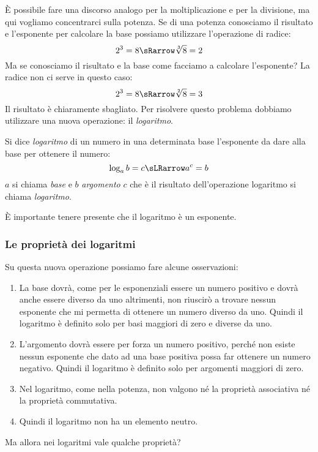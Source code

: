 È possibile fare una discorso analogo per la moltiplicazione e per la 
divisione, ma qui vogliamo concentrarci sulla potenza. Se di una potenza 
conosciamo il risultato e l'esponente per calcolare la base possiamo utilizzare 
l'operazione di radice:
\[2^3 = 8 \sRarrow \sqrt[3]{8} = 2 \]
Ma se conosciamo il risultato e la base come facciamo a calcolare l'esponente?
La radice non ci serve in questo caso:
\[2^3 = 8 \sRarrow \sqrt[2]{8} = 3 \]
Il risultato è chiaramente sbagliato. Per risolvere questo problema dobbiamo 
utilizzare una nuova operazione: il \emph{logaritmo}.

\begin{definizione}[Logaritmo]
 Si dice \emph{logaritmo} di un numero in una determinata base l'esponente da 
dare alla base per ottenere il numero:
\[\log_a {b} = c \sLRarrow a^c = b\]
\(a\) si chiama \emph{base} e \(b\) \emph{argomento} \(c\) che è il risultato 
dell'operazione logaritmo si chiama \emph{logaritmo}.
\end{definizione}

È importante tenere presente che il logaritmo è un esponente. 

\subsubsection{Le proprietà dei logaritmi}
\label{subsubsec:esplog_proprieta_logaritmi}

Su questa nuova operazione possiamo fare alcune osservazioni:

\begin{enumerate}
 \item La base dovrà, come per le esponenziali essere un numero positivo e 
dovrà anche essere diverso da uno altrimenti, non riuscirò a trovare nessun 
esponente che mi permetta di ottenere un numero diverso da uno. Quindi il 
logaritmo è definito solo per basi maggiori di zero e diverse da uno.
 \item L'argomento dovrà essere per forza un numero positivo, perché non esiste 
nessun esponente che dato ad una base positiva possa far ottenere un numero 
negativo. Quindi il logaritmo è definito solo per argomenti maggiori di zero.
 \item Nel logaritmo, come nella potenza, non valgono né la proprietà 
associativa né la proprietà commutativa.
 \item Quindi il logaritmo non ha un elemento neutro.
\end{enumerate}

Ma allora nei logaritmi vale qualche proprietà?

